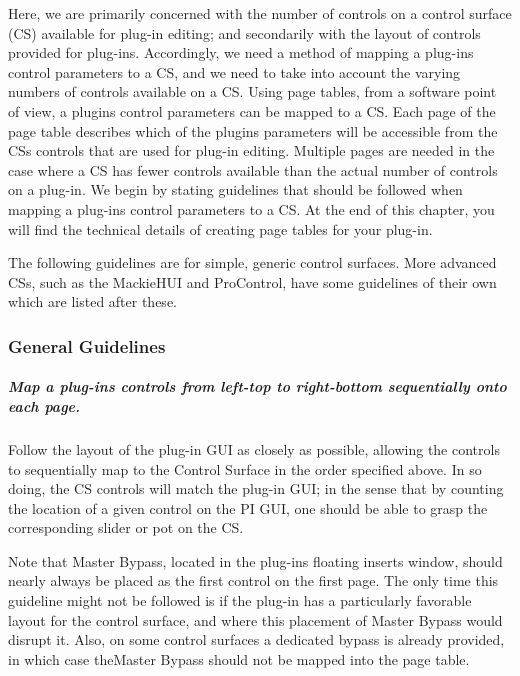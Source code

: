 Here, we are primarily concerned with the number of controls on a control surface (C\+S) available for plug-\/in editing; and secondarily with the layout of controls provided for plug-\/ins. Accordingly, we need a method of mapping a plug-\/in\textquotesingle{}s control parameters to a C\+S, and we need to take into account the varying numbers of controls available on a C\+S. Using \textquotesingle{}page tables\textquotesingle{}, from a software point of view, a plugin\textquotesingle{}s control parameters can be mapped to a C\+S. Each page of the page table describes which of the plugin\textquotesingle{}s parameters will be accessible from the C\+S\textquotesingle{}s controls that are used for plug-\/in editing. Multiple pages are needed in the case where a C\+S has fewer controls available than the actual number of controls on a plug-\/in. We begin by stating guidelines that should be followed when mapping a plug-\/in\textquotesingle{}s control parameters to a C\+S. At the end of this chapter, you will find the technical details of creating page tables for your plug-\/in.

The following guidelines are for simple, generic control surfaces. More advanced C\+Ss, such as the Mackie\+H\+U\+I and Pro\+Control, have some guidelines of their own which are listed after these.

\hypertarget{a00363_subsection__general_guidelines}{}\subsubsection{General Guidelines}\label{a00363_subsection__general_guidelines}
 \subparagraph*{Map a plug-\/in\textquotesingle{}s controls from left-\/top to right-\/bottom sequentially onto each page.}

  Follow the layout of the plug-\/in G\+U\+I as closely as possible, allowing the controls to sequentially map to the Control Surface in the order specified above. In so doing, the C\+S controls will match the plug-\/in G\+U\+I; in the sense that by counting the location of a given control on the P\+I G\+U\+I, one should be able to grasp the corresponding slider or pot on the C\+S.

 Note that Master Bypass, located in the plug-\/in\textquotesingle{}s floating inserts window, should nearly always be placed as the first control on the first page. The only time this guideline might not be followed is if the plug-\/in has a particularly favorable layout for the control surface, and where this placement of Master Bypass would disrupt it. Also, on some control surfaces a dedicated bypass is already provided, in which case the\+Master Bypass should not be mapped into the page table. 

